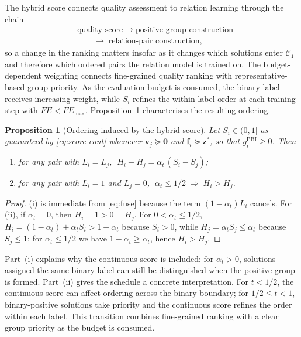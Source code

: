 \documentclass[final,5p,times,twocolumn]{elsarticle}
\newtheorem{proposition}{Proposition}
\newcommand{\vf}{\mathbf{f}}
\newcommand{\vv}{\mathbf{v}}
\newcommand{\vz}{\mathbf{z}}
\begin{document}
The hybrid score connects quality assessment to relation learning through the
chain
\begin{equation*}
\begin{aligned}
&\text{quality score}\;\rightarrow\;\text{positive-group construction}\\
&\qquad\rightarrow\;\text{relation-pair construction},
\end{aligned}
\end{equation*}
so a change in the ranking matters insofar as it changes
which solutions enter $\mathcal{C}_1$ and therefore which ordered pairs the
relation model is trained on. The budget-dependent weighting connects
fine-grained quality ranking with representative-based group priority. As the
evaluation budget is consumed, the binary label receives increasing weight,
while $S_i$ refines the within-label order at each training step with $FE<FE_{\max}$.
Proposition~\ref{prop:order} characterises the resulting ordering.

\begin{proposition}[Ordering induced by the hybrid score]
\label{prop:order}
Let $S_i\in(0,1]$ as guaranteed by \eqref{eq:score-cont} whenever
$\vv_j\succeq\bm{0}$ and $\vf_i\succeq\vz^{*}$, so that
$g_i^{\mathrm{PBI}}\geq0$. Then
\begin{enumerate}[label=(\roman*),leftmargin=*,itemsep=1pt]
\item for any pair with $L_i=L_j$,
      $\;H_i-H_j=\alpha_t\,(S_i-S_j)$;
\item for any pair with $L_i=1$ and $L_j=0$,
      $\;\alpha_t\leq1/2\;\Rightarrow\;H_i>H_j$.
\end{enumerate}
\end{proposition}

\begin{proof}
(i) is immediate from \eqref{eq:fuse} because the term $(1-\alpha_t)L_i$
cancels. For (ii), if $\alpha_t=0$, then $H_i=1>0=H_j$.
For $0<\alpha_t\leq1/2$, $H_i=(1-\alpha_t)+\alpha_tS_i>1-\alpha_t$ because $S_i>0$,
while $H_j=\alpha_tS_j\leq\alpha_t$ because $S_j\leq1$; for
$\alpha_t\leq1/2$ we have $1-\alpha_t\geq\alpha_t$, hence $H_i>H_j$.
\end{proof}

Part~(i) explains why the continuous score is included: for $\alpha_t>0$,
solutions assigned the same binary label can still be distinguished when the
positive group is formed. Part~(ii) gives the schedule a concrete interpretation.
For $t<1/2$, the continuous score can affect ordering across the binary boundary;
for $1/2\leq t<1$, binary-positive solutions take priority and the continuous
score refines the order within each label. This transition combines fine-grained
ranking with a clear group priority as the budget is consumed.
\end{document}
